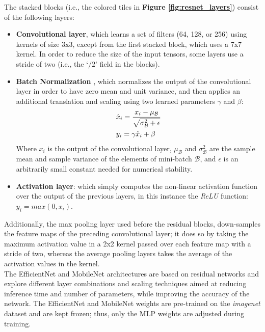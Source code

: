 \noindent
The stacked blocks (i.e., the colored tiles in \textbf{Figure \ref{fig:resnet_layers}}) consist of the following layers:
\begin{itemize}
    \item \textbf{Convolutional layer}, which learns a set of filters (64, 128, or 256) using kernels of size 3x3, except from the first stacked block, which uses a 7x7 kernel. In order to reduce the size of the input tensors, some layers use a stride of two (i.e., the `$/2$' field in the blocks).
    
    \item \textbf{Batch Normalization} \cite{ioffe2015batch}, which normalizes the output of the convolutional layer in order to have zero mean and unit variance, and then applies an additional translation and scaling using two learned parameters $\gamma$ and $\beta$:
    \begin{equation*}
    \begin{split}
        \centering
            &\hat x_i = \frac{x_i - \mu_\mathcal{B}}{\sqrt{\sigma^2_\mathcal{B} + \epsilon}}\\
            &y_i = \gamma\hat x_i + \beta\\
    \end{split}
    \end{equation*}
    Where $x_i$ is the output of the convolutional layer, $\mu_\mathcal{B}$ and $\sigma^2_\mathcal{B}$ are the sample mean and sample variance of the elements of mini-batch $\mathcal{B}$, and $\epsilon$ is an arbitrarily small constant needed for numerical stability.
    
    \item \textbf{Activation layer}: which simply computes the non-linear activation function over the output of the previous layers, in this instance the \textit{ReLU} function: $y_i = max(0, x_i)$. 
\end{itemize}

\noindent
Additionally, the max pooling layer used before the residual blocks, down-samples the feature maps of the preceding convolutional layer; it does so by taking the maximum activation value in a 2x2 kernel passed over each feature map with a stride of two, whereas the average pooling layers takes the average of the activation values in the kernel.\\

\noindent
The EfficientNet and MobileNet architectures are based on residual networks and explore different layer combinations and scaling techniques aimed at reducing inference time and number of parameters, while improving the accuracy of the network.
The EfficientNet and MobileNet weights are pre-trained on the \textit{imagenet} dataset \cite{deng2009imagenet} and are kept frozen; thus, only the MLP weights are adjusted during training.

